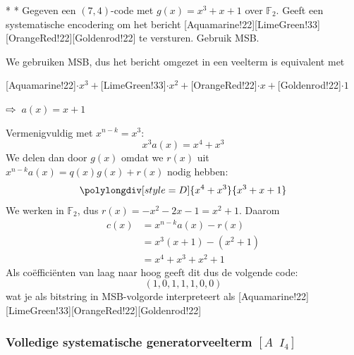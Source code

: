 \begin{niceexample}*\label{voorbeeld:l9_systematische-encodering}
    \nextpart[]*
    Gegeven een $(7,4)$-code met $g(x) = x^3 + x + 1$ over $\mathbb{F}_2$. Geeft een systematische encodering om het bericht [Aquamarine!22][LimeGreen!33][OrangeRed!22][Goldenrod!22] te versturen. Gebruik MSB.
\end{niceexample}
\textbf{} We gebruiken MSB, dus het bericht omgezet in een veelterm is equivalent met
\begin{center}
    [Aquamarine!22]$\cdot x^3 +$[LimeGreen!33]$\cdot x^2 +$[OrangeRed!22]$\cdot x +$[Goldenrod!22]$\cdot 1$ 
\end{center}
$\rightwhitearrow\;\; a(x) = x + 1$

Vermenigvuldig met $x^{n-k} = x^3$:
\begin{equation*}
    x^3a(x) = x^4+x^3
\end{equation*}
We delen dan door $g(x)$ omdat we $r(x)$ uit $x^{n-k}a(x) = q(x)g(x)+r(x)$ nodig hebben:
\begin{equation*}
    \polylongdiv[style=D]{x^4+x^3}{x^3+x+1}    
\end{equation*}
We werken in $\mathbb{F}_2$, dus $r(x)=-x^2 -2x -1 = x^2+1$. Daarom
\begin{equation*}
    \begin{aligned}
        c(x) &= x^{n-k}a(x) - r(x) \\
             &= x^3(x+1) - (x^2+1) \\
             &= x^4 + x^3 + x^2 + 1
    \end{aligned}
\end{equation*}
Als coëfficiënten van laag naar hoog geeft dit dus de volgende code:
\begin{equation*}
    (1,0,1,1,1,0,0)
\end{equation*}
wat je als bitstring in MSB-volgorde interpreteert als [Aquamarine!22][LimeGreen!33][OrangeRed!22][Goldenrod!22]

\subsubsection{Volledige systematische generatorveelterm \texorpdfstring{$\left[A\;\;I_4\right]$}{[A I4]}}

